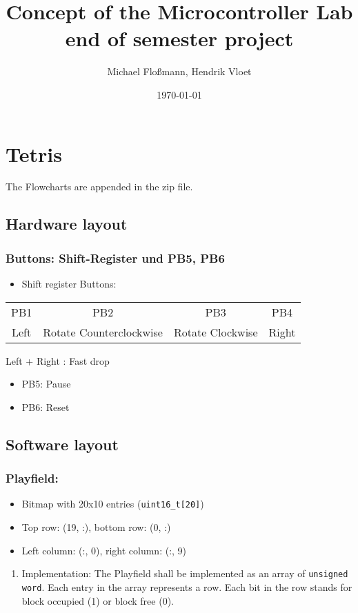\documentclass[11pt]{article}
\author{Michael Floßmann, Hendrik Vloet}
\date{\today}
\title{Concept of the Microcontroller Lab end of semester project}
\begin{document}
\maketitle
\section{Tetris}
\label{sec:orgb0bb6ea}
The Flowcharts are appended in the zip file.
\subsection{Hardware layout}
\label{sec:orge42c8c6}
\subsubsection{Buttons: Shift-Register und PB5, PB6}
\label{sec:org399fab2}
\begin{itemize}
\item Shift register Buttons:
\end{itemize}
\begin{center}
\begin{tabular}{c|c|c|c}
PB1 & PB2 & PB3 & PB4\\
Left & Rotate Counterclockwise & Rotate Clockwise & Right\\
\end{tabular}
\end{center}
Left + Right : Fast drop
\begin{itemize}
\item PB5: Pause
\item PB6: Reset
\end{itemize}
\subsection{Software layout}
\label{sec:orgbb443ea}
\subsubsection{Playfield:}
\label{sec:org84e494e}
\begin{itemize}
\item Bitmap with 20x10 entries (\texttt{uint16\_t[20]})
\item Top row: (19, :), bottom row: (0, :)
\item Left column: (:, 0), right column: (:, 9)
\end{itemize}
\begin{enumerate}
\item Implementation:
\label{sec:orgccc8ab0}
The Playfield shall be implemented as an array of \texttt{unsigned word}. Each entry in the array represents a row. Each bit in the row stands for block occupied (1) or block free (0).
\end{enumerate}
\end{document}
